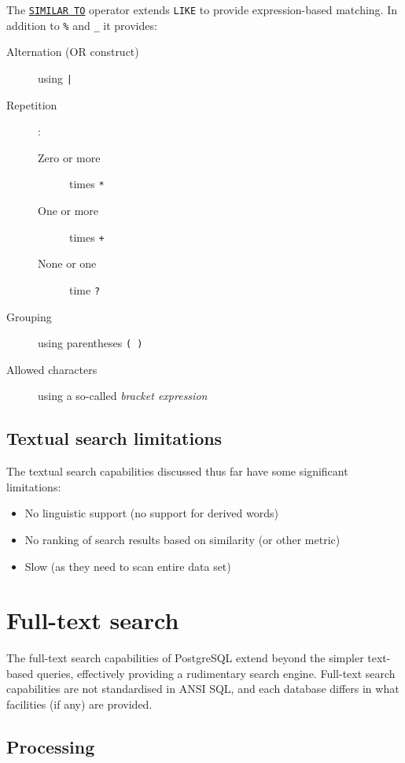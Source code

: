 \documentclass{pgnotes}
\begin{document}
The \href{https://www.postgresql.org/docs/current/functions-matching.html#FUNCTIONS-SIMILARTO-REGEXP}{\texttt{SIMILAR TO}} operator extends \texttt{LIKE} to provide expression-based matching.
In addition to \texttt{\%} and \texttt{\_} it provides:

\begin{description}
\item[Alternation (OR construct)] using \texttt{|}
\item[Repetition]:
  \begin{description}
  \item[Zero or more] times \texttt{*}
  \item[One or more] times \texttt{+}
  \item[None or one] time \texttt{?}
  \end{description}
\item[Grouping] using parentheses \texttt{( )}
\item[Allowed characters] using a so-called \textit{bracket expression} 
\end{description}

\subsection{Textual search limitations}

The textual search capabilities discussed thus far have some significant limitations:

\begin{itemize}
\item No linguistic support (no support for derived words)
\item No ranking of search results based on similarity (or other metric)
\item Slow (as they need to scan entire data set)
\end{itemize}

\section{Full-text search} 

The full-text search capabilities of PostgreSQL extend beyond the simpler text-based queries, effectively providing a rudimentary search engine.
Full-text search capabilities are not standardised in ANSI SQL, and each database differs in what facilities (if any) are provided.

\subsection{Processing}
\end{document}
